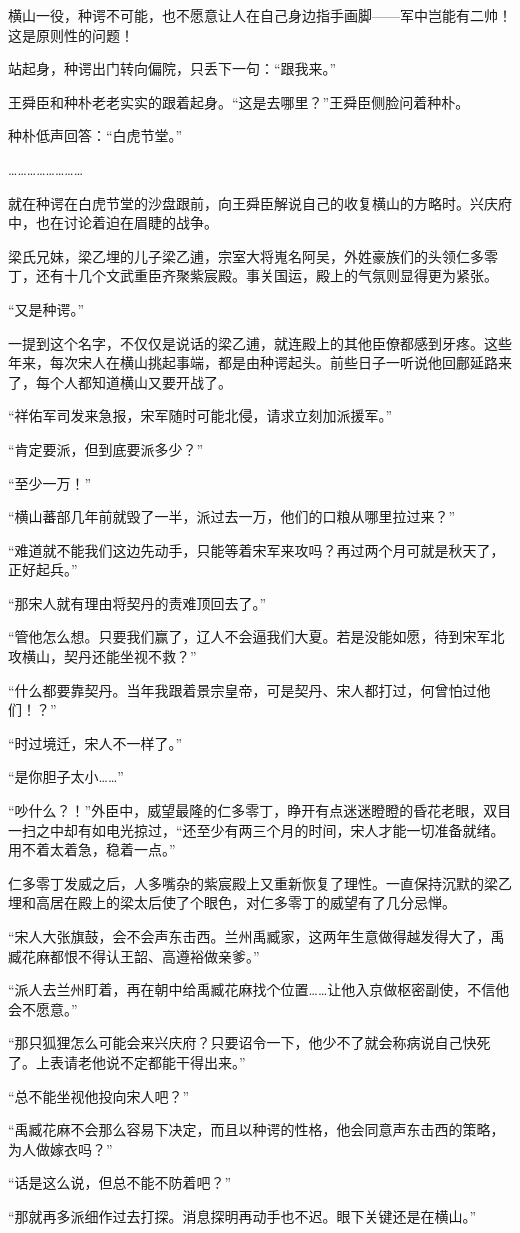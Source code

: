 横山一役，种谔不可能，也不愿意让人在自己身边指手画脚——军中岂能有二帅！这是原则性的问题！

站起身，种谔出门转向偏院，只丢下一句：“跟我来。”

王舜臣和种朴老老实实的跟着起身。“这是去哪里？”王舜臣侧脸问着种朴。

种朴低声回答：“白虎节堂。”

……………………

就在种谔在白虎节堂的沙盘跟前，向王舜臣解说自己的收复横山的方略时。兴庆府中，也在讨论着迫在眉睫的战争。

梁氏兄妹，梁乙埋的儿子梁乙逋，宗室大将嵬名阿吴，外姓豪族们的头领仁多零丁，还有十几个文武重臣齐聚紫宸殿。事关国运，殿上的气氛则显得更为紧张。

“又是种谔。”

一提到这个名字，不仅仅是说话的梁乙逋，就连殿上的其他臣僚都感到牙疼。这些年来，每次宋人在横山挑起事端，都是由种谔起头。前些日子一听说他回鄜延路来了，每个人都知道横山又要开战了。

“祥佑军司发来急报，宋军随时可能北侵，请求立刻加派援军。”

“肯定要派，但到底要派多少？”

“至少一万！”

“横山蕃部几年前就毁了一半，派过去一万，他们的口粮从哪里拉过来？”

“难道就不能我们这边先动手，只能等着宋军来攻吗？再过两个月可就是秋天了，正好起兵。”

“那宋人就有理由将契丹的责难顶回去了。”

“管他怎么想。只要我们赢了，辽人不会逼我们大夏。若是没能如愿，待到宋军北攻横山，契丹还能坐视不救？”

“什么都要靠契丹。当年我跟着景宗皇帝，可是契丹、宋人都打过，何曾怕过他们！？”

“时过境迁，宋人不一样了。”

“是你胆子太小……”

“吵什么？！”外臣中，威望最隆的仁多零丁，睁开有点迷迷瞪瞪的昏花老眼，双目一扫之中却有如电光掠过，“还至少有两三个月的时间，宋人才能一切准备就绪。用不着太着急，稳着一点。”

仁多零丁发威之后，人多嘴杂的紫宸殿上又重新恢复了理性。一直保持沉默的梁乙埋和高居在殿上的梁太后使了个眼色，对仁多零丁的威望有了几分忌惮。

“宋人大张旗鼓，会不会声东击西。兰州禹臧家，这两年生意做得越发得大了，禹臧花麻都恨不得认王韶、高遵裕做亲爹。”

“派人去兰州盯着，再在朝中给禹臧花麻找个位置……让他入京做枢密副使，不信他会不愿意。”

“那只狐狸怎么可能会来兴庆府？只要诏令一下，他少不了就会称病说自己快死了。上表请老他说不定都能干得出来。”

“总不能坐视他投向宋人吧？”

“禹臧花麻不会那么容易下决定，而且以种谔的性格，他会同意声东击西的策略，为人做嫁衣吗？”

“话是这么说，但总不能不防着吧？”

“那就再多派细作过去打探。消息探明再动手也不迟。眼下关键还是在横山。”

